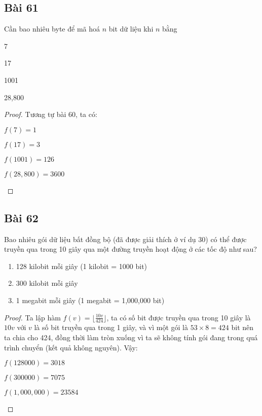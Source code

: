 \subsection*{Bài 61}
Cần bao nhiêu byte để mã hoá $n$ bit dữ liệu khi $n$ bằng
\begin{enumerate}[label=\alph*)]
    \begin{multicols}{4}
        \item 7
        \item 17
        \item 1001
        \item 28,800
    \end{multicols}
\end{enumerate}
\begin{proof}
    Tương tự bài 60, ta có:
    \begin{enumerate}[label=\alph*)]
        \begin{multicols}{2}
            \item $f(7)=1$
            \item $f(17)=3$
            \item $f(1001)=126$
            \item $f(28,800)=3600$
        \end{multicols}
    \end{enumerate}
\end{proof}
\subsection*{Bài 62}
Bao nhiêu gói dữ liệu bất đồng bộ (đã được giải thích ở ví dụ 30) có thể được truyền qua trong 10 giây qua một đường truyền hoạt động ở các tốc độ như sau?
\begin{enumerate}[label=\alph*)]
    \item 128 kilobit mỗi giây (1 kilobit = 1000 bit)
    \item 300 kilobit mỗi giây
    \item 1 megabit mỗi giây (1 megabit = 1,000,000 bit)
\end{enumerate}
\begin{proof}
    Ta lập hàm $f(v)=\lfloor \frac{10v}{424} \rfloor$, ta có số bit được truyền qua trong 10 giây là $10v$ với $v$ là số bit truyền qua trong 1 giây, và vì một gói là $53\times 8=424$ bit nên ta chia cho 424, đồng thời làm tròn xuống vì ta sẽ không tính gói đang trong quá trình chuyển (kết quả không nguyên). Vậy:
    \begin{enumerate}[label=\alph*)]
        \begin{multicols}{3}
            \item $f(128000)=3018$
            \item $f(300000)=7075$
            \item $f(1,000,000)=23584$
        \end{multicols}
    \end{enumerate}
\end{proof}
